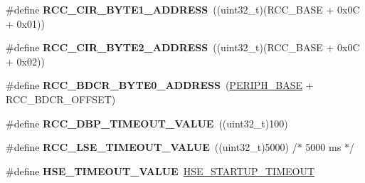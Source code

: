 \begin{DoxyCompactItemize}
\item 
\#define {\bfseries R\+C\+C\+\_\+\+C\+I\+R\+\_\+\+B\+Y\+T\+E1\+\_\+\+A\+D\+D\+R\+E\+SS}~((uint32\+\_\+t)(R\+C\+C\+\_\+\+B\+A\+SE + 0x0\+C + 0x01))\hypertarget{group___r_c_c___bit_address___alias_region_ga97f80d22ba3506a43accbeb9ceb31f51}{}\label{group___r_c_c___bit_address___alias_region_ga97f80d22ba3506a43accbeb9ceb31f51}

\item 
\#define {\bfseries R\+C\+C\+\_\+\+C\+I\+R\+\_\+\+B\+Y\+T\+E2\+\_\+\+A\+D\+D\+R\+E\+SS}~((uint32\+\_\+t)(R\+C\+C\+\_\+\+B\+A\+SE + 0x0\+C + 0x02))\hypertarget{group___r_c_c___bit_address___alias_region_ga1387fb2dfadb830eb83ab2772c8d2294}{}\label{group___r_c_c___bit_address___alias_region_ga1387fb2dfadb830eb83ab2772c8d2294}

\item 
\#define {\bfseries R\+C\+C\+\_\+\+B\+D\+C\+R\+\_\+\+B\+Y\+T\+E0\+\_\+\+A\+D\+D\+R\+E\+SS}~(\hyperlink{group___peripheral__memory__map_ga9171f49478fa86d932f89e78e73b88b0}{P\+E\+R\+I\+P\+H\+\_\+\+B\+A\+SE} + R\+C\+C\+\_\+\+B\+D\+C\+R\+\_\+\+O\+F\+F\+S\+ET)\hypertarget{group___r_c_c___bit_address___alias_region_ga12a7b221df58454d4c59e1d3109b72f2}{}\label{group___r_c_c___bit_address___alias_region_ga12a7b221df58454d4c59e1d3109b72f2}

\item 
\#define {\bfseries R\+C\+C\+\_\+\+D\+B\+P\+\_\+\+T\+I\+M\+E\+O\+U\+T\+\_\+\+V\+A\+L\+UE}~((uint32\+\_\+t)100)\hypertarget{group___r_c_c___bit_address___alias_region_gae578b5efd6bd38193ab426ce65cb77b1}{}\label{group___r_c_c___bit_address___alias_region_gae578b5efd6bd38193ab426ce65cb77b1}

\item 
\#define {\bfseries R\+C\+C\+\_\+\+L\+S\+E\+\_\+\+T\+I\+M\+E\+O\+U\+T\+\_\+\+V\+A\+L\+UE}~((uint32\+\_\+t)5000)  /$\ast$ 5000 ms $\ast$/\hypertarget{group___r_c_c___bit_address___alias_region_gafe8ed1c0ca0e1c17ea69e09391498cc7}{}\label{group___r_c_c___bit_address___alias_region_gafe8ed1c0ca0e1c17ea69e09391498cc7}

\item 
\#define {\bfseries H\+S\+E\+\_\+\+T\+I\+M\+E\+O\+U\+T\+\_\+\+V\+A\+L\+UE}~\hyperlink{stm32f4xx__hal__conf__template_8h_a68ecbc9b0a1a40a1ec9d18d5e9747c4f}{H\+S\+E\+\_\+\+S\+T\+A\+R\+T\+U\+P\+\_\+\+T\+I\+M\+E\+O\+UT}\hypertarget{group___r_c_c___bit_address___alias_region_gac0cd4ed24fa948844e1a40b12c450f32}{}\label{group___r_c_c___bit_address___alias_region_gac0cd4ed24fa948844e1a40b12c450f32}


\end{DoxyCompactItemize}
